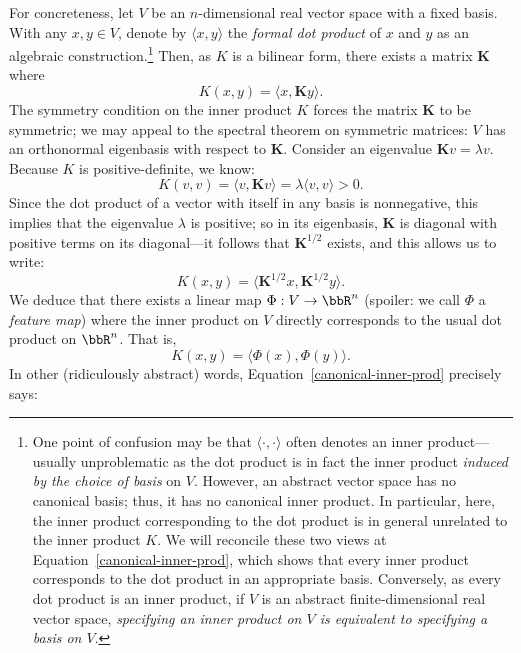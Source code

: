 \documentclass[twoside,11pt]{homework}
\begin{document}
For concreteness, let $V$ be an $n$-dimensional real vector space with a fixed basis. With any $x,y \in V$, denote by $\langle x,y\rangle$ the \emph{formal dot product} of $x$ and $y$ as an algebraic construction.\footnote{One point of confusion may be that $\langle \cdot,\cdot \rangle$ often denotes an inner product---usually unproblematic as the dot product is in fact the inner product \emph{induced by the choice of basis} on $V$. However, an abstract vector space has no canonical basis; thus, it has no canonical inner product. In particular, here, the inner product corresponding to the dot product is in general unrelated to the inner product $K$. We will reconcile these two views at Equation~\ref{canonical-inner-prod}, which shows that every inner product corresponds to the dot product in an appropriate basis. Conversely, as every dot product is an inner product, if $V$ is an abstract finite-dimensional real vector space, \emph{specifying an inner product on $V$ is equivalent to specifying a basis on $V$}.} Then, as $K$ is a bilinear form, there exists a matrix $\mathbf{K}$ where
\begin{equation}\label{kernel-history}
  K(x,y) = \langle x, \mathbf{K}y\rangle.
\end{equation}
The symmetry condition on the inner product $K$ forces the matrix $\mathbf{K}$ to be symmetric; we may appeal to the spectral theorem on symmetric matrices: $V$ has an orthonormal eigenbasis with respect to $\mathbf{K}$. Consider an eigenvalue $\mathbf{K} v = \lambda v$. Because $K$ is positive-definite, we know:
\[K(v,v) = \langle v, \mathbf{K}v\rangle = \lambda \langle v,v\rangle> 0.\]
Since the dot product of a vector with itself in any basis is nonnegative, this implies that the eigenvalue $\lambda$ is positive; so in its eigenbasis, $\mathbf{K}$ is diagonal with positive terms on its diagonal---it follows that $\mathbf{K}^{1/2}$ exists, and this allows us to write:
\begin{equation}
  K(x,y) = \langle \mathbf{K}^{1/2} x, \mathbf{K}^{1/2}y\rangle.
\end{equation}
We deduce that there exists a linear map $\Phi: V \to \bbR^n$ (spoiler: we call $\Phi$ a \emph{feature map}) where the inner product on $V$ directly corresponds to the usual dot product on $\bbR^n$. That is,
\begin{equation}\label{canonical-inner-prod}
  K(x,y) = \langle \Phi(x), \Phi(y)\rangle.
\end{equation}
In other (ridiculously abstract) words, Equation~\ref{canonical-inner-prod} precisely says:
\end{document}
